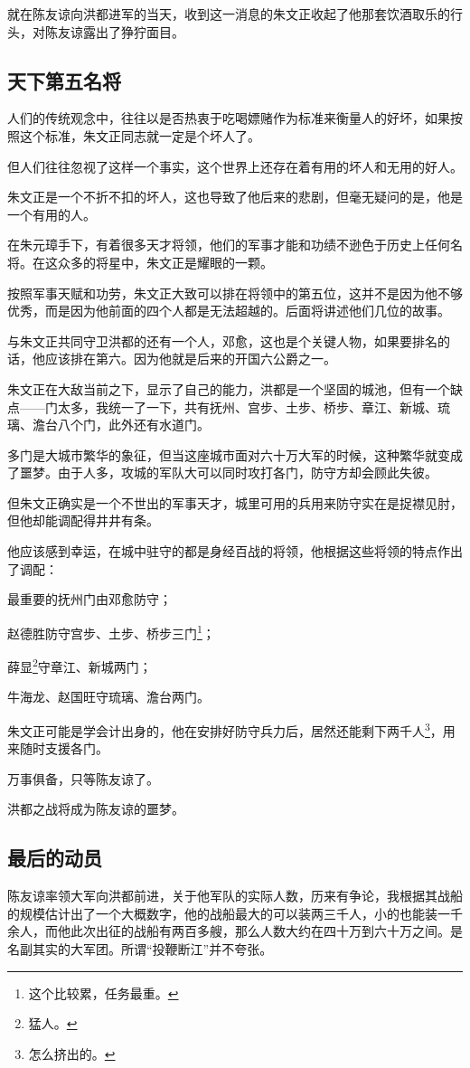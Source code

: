 \begin{multicols}{\theparacolNo}
		就在陈友谅向洪都进军的当天，收到这一消息的朱文正收起了他那套饮酒取乐的行头，对陈友谅露出了狰狞面目。

		\subsection{天下第五名将}
		人们的传统观念中，往往以是否热衷于吃喝嫖赌作为标准来衡量人的好坏，如果按照这个标准，朱文正同志就一定是个坏人了。

		但人们往往忽视了这样一个事实，这个世界上还存在着有用的坏人和无用的好人。

		朱文正是一个不折不扣的坏人，这也导致了他后来的悲剧，但毫无疑问的是，他是一个有用的人。

		在朱元璋手下，有着很多天才将领，他们的军事才能和功绩不逊色于历史上任何名将。在这众多的将星中，朱文正是耀眼的一颗。

		按照军事天赋和功劳，朱文正大致可以排在将领中的第五位，这并不是因为他不够优秀，而是因为他前面的四个人都是无法超越的。后面将讲述他们几位的故事。

		与朱文正共同守卫洪都的还有一个人，邓愈，这也是个关键人物，如果要排名的话，他应该排在第六。因为他就是后来的开国六公爵之一。

		朱文正在大敌当前之下，显示了自己的能力，洪都是一个坚固的城池，但有一个缺点——门太多，我统一了一下，共有抚州、宫步、土步、桥步、章江、新城、琉璃、澹台八个门，此外还有水道门。

		多门是大城市繁华的象征，但当这座城市面对六十万大军的时候，这种繁华就变成了噩梦。由于人多，攻城的军队大可以同时攻打各门，防守方却会顾此失彼。

		但朱文正确实是一个不世出的军事天才，城里可用的兵用来防守实在是捉襟见肘，但他却能调配得井井有条。

		他应该感到幸运，在城中驻守的都是身经百战的将领，他根据这些将领的特点作出了调配：

		最重要的抚州门由邓愈防守；

		赵德胜防守宫步、土步、桥步三门\footnote{这个比较累，任务最重。}；

		薛显\footnote{猛人。}守章江、新城两门；

		牛海龙、赵国旺守琉璃、澹台两门。

		朱文正可能是学会计出身的，他在安排好防守兵力后，居然还能剩下两千人\footnote{怎么挤出的。}，用来随时支援各门。

		万事俱备，只等陈友谅了。

		洪都之战将成为陈友谅的噩梦。

		\subsection{最后的动员}
		陈友谅率领大军向洪都前进，关于他军队的实际人数，历来有争论，我根据其战船的规模估计出了一个大概数字，他的战船最大的可以装两三千人，小的也能装一千余人，而他此次出征的战船有两百多艘，那么人数大约在四十万到六十万之间。是名副其实的大军团。所谓“投鞭断江”并不夸张。


\end{multicols}
